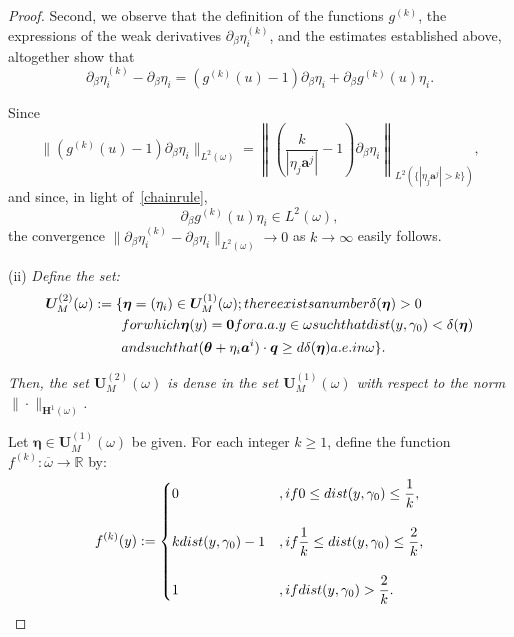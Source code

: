 \documentclass{amsart}
\begin{document}
\begin{proof}
	Second, we observe that the definition of the functions $g^{(k)}$, the expressions of the weak derivatives $\partial_\beta \eta_i^{(k)}$, and the estimates established above, altogether show that
	\begin{equation}
		\label{chainrule}
		\partial_\beta \eta_i^{(k)} - \partial_\beta \eta_i = (g^{(k)}(u)-1) \partial_\beta \eta_i +\partial_\beta g^{(k)}(u)\eta_i.
	\end{equation}
	
	Since
	\begin{equation*}
		\|(g^{(k)}(u)-1) \partial_\beta \eta_i\|_{L^2(\omega)}=
		\left\|\left( \frac{k}{|\eta_j\bm{a}^j|}-1\right) \partial_\beta\eta_i\right\|_{L^2(\{|\eta_j\bm{a}^j|>k\})},
	\end{equation*}
	and since, in light of~\eqref{chainrule},
	\begin{equation*}
		\partial_\beta g^{(k)}(u)\eta_i\in L^2(\omega),
	\end{equation*}
	the convergence $\|\partial_\beta \eta_i^{(k)} - \partial_\beta \eta_i\|_{L^2(\omega)}\to 0$ as $k\to\infty$ easily follows.
	
	(ii) \emph{Define the set:}
	\begin{equation*}
		\begin{aligned}
			\bm{U}_M^{(2)}(\omega)&:=\{\bm{\eta}=(\eta_i)\in\bm{U}_M^{(1)}(\omega); \textup{ there exists a number }\delta(\bm{\eta})>0\\
			&\qquad\textup{ for which }\bm{\eta}(y)=\bm{0} \textup{ for a.a. } y\in\omega \textup{ such that }\textup{dist}(y,\gamma_0)<\delta(\bm{\eta})\\
			&\qquad\textup{ and such that }(\bm{\theta}+\eta_i\bm{a}^i)\cdot\bm{q}\ge d\delta(\bm{\eta}) \textup{ a.e. in }\omega\}.
		\end{aligned}
	\end{equation*}
	
	\emph{Then, the set $\bm{U}_M^{(2)}(\omega)$ is dense in the set $\bm{U}_M^{(1)}(\omega)$ with respect to the norm $\|\cdot\|_{\bm{H}^1(\omega)}$.}
	
	Let $\bm{\eta} \in \bm{U}_M^{(1)}(\omega)$ be given. For each integer $k\ge 1$, define the function $f^{(k)}:\overline{\omega}\to\mathbb{R}$ by:
	\begin{equation*}
		f^{(k)}(y):=
		\begin{cases}
			0&,\textup{ if }0\le \textup{dist}(y,\gamma_0)\le \dfrac{1}{k},\\
			\\
			k\textup{dist}(y,\gamma_0)-1&,\textup{ if }\dfrac{1}{k}\le \textup{dist}(y,\gamma_0)\le\dfrac{2}{k},\\
			\\
			1&,\textup{ if } \textup{dist}(y,\gamma_0)>\dfrac{2}{k}.
		\end{cases}
	\end{equation*}
	

\end{proof}
\end{document}
